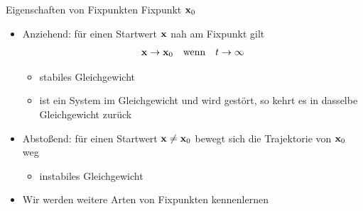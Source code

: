 \begin{frame}{Eigenschaften von Fixpunkten}
  Fixpunkt $\mathbf{x}_0$
  \begin{itemize}
  \item Anziehend: für einen Startwert $\mathbf{x}$ nah am Fixpunkt gilt
    \begin{gather*}
      \mathbf{x}\to\mathbf{x}_0\quad\text{wenn}\quad t\to\infty
    \end{gather*}
    \begin{itemize}
    \item stabiles Gleichgewicht
    \item ist ein System im Gleichgewicht und wird gestört, so
      kehrt es in dasselbe Gleichgewicht zurück
    \end{itemize}
  \item Absto\ss{}end: für einen Startwert $\mathbf{x}\neq\mathbf{x}_0$ bewegt sich
    die Trajektorie von $\mathbf{x}_0$ weg
    \begin{itemize}
    \item instabiles Gleichgewicht
    \end{itemize}
  \item Wir werden weitere Arten von Fixpunkten kennenlernen
  \end{itemize}
\end{frame}

